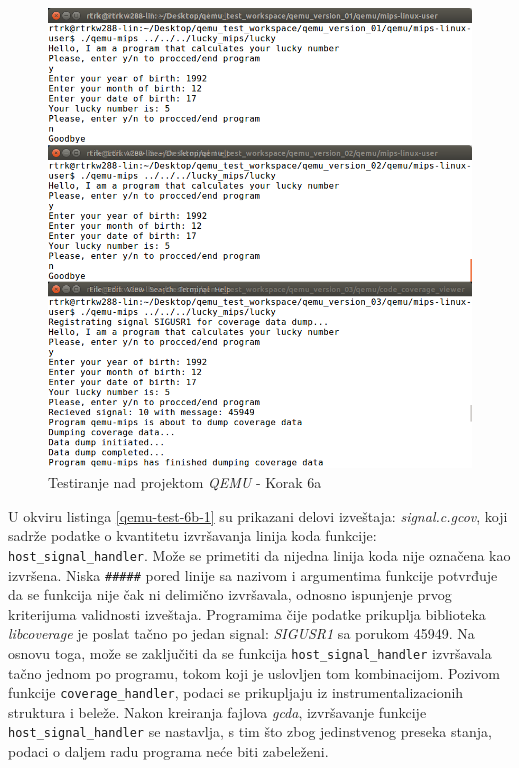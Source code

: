 \documentclass[12pt,oneside]{memoir}
\newcommand{\kod}[1]{\texttt{#1}}
\newcommand{\strano}[1]{\textit{#1}}
\begin{document}
\begin{figure}[!ht]
  \centering
  \includegraphics[width=\textwidth]{img/qemu-test-6a-ng.png}
  \caption{Testiranje nad projektom \strano{QEMU} - Korak 6a}
  \label{fig:qemu-test-6a}
\end{figure} 

\newpage

U okviru listinga \ref{qemu-test-6b-1} su prikazani delovi izveštaja: \strano{signal.c.gcov}, koji sadrže podatke o kvantitetu izvršavanja linija koda funkcije: \kod{host\_signal\_handler}.
Može se primetiti da nijedna linija koda nije označena kao izvršena. Niska \kod{\#\#\#\#\#} pored linije sa nazivom i argumentima funkcije potvrđuje da se funkcija nije čak ni delimično izvršavala, odnosno ispunjenje prvog kriterijuma validnosti izveštaja. Programima čije podatke prikuplja biblioteka \strano{libcoverage} je poslat tačno po jedan signal: \strano{SIGUSR1} sa porukom 45949. Na osnovu toga, može se zaključiti da se funkcija \kod{host\_signal\_handler} izvršavala tačno jednom po programu, tokom koji je uslovljen tom kombinacijom. Pozivom funkcije \kod{coverage\_handler}, podaci se prikupljaju iz instrumentalizacionih struktura i beleže. Nakon kreiranja fajlova \strano{gcda}, izvršavanje funkcije \kod{host\_signal\_handler} se nastavlja, s tim što zbog jedinstvenog preseka stanja, podaci o daljem radu programa neće biti zabeleženi. 
\\
\end{document}
